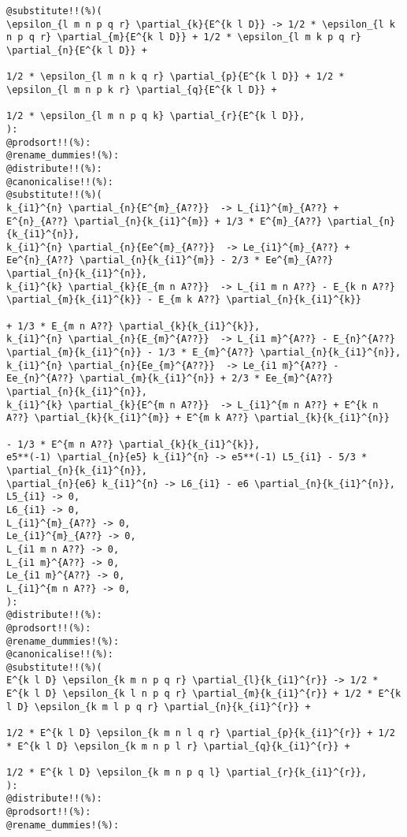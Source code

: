 \documentclass[11pt]{article}
\begin{document}
{\color[named]{Blue}\begin{verbatim}
@substitute!!(%)(
\epsilon_{l m n p q r} \partial_{k}{E^{k l D}} -> 1/2 * \epsilon_{l k n p q r} \partial_{m}{E^{k l D}} + 1/2 * \epsilon_{l m k p q r} \partial_{n}{E^{k l D}} + 
                                                                               1/2 * \epsilon_{l m n k q r} \partial_{p}{E^{k l D}} + 1/2 * \epsilon_{l m n p k r} \partial_{q}{E^{k l D}} +
                                                                               1/2 * \epsilon_{l m n p q k} \partial_{r}{E^{k l D}},
):
@prodsort!!(%):
@rename_dummies!(%):
@distribute!!(%):
@canonicalise!!(%):
@substitute!!(%)(
k_{i1}^{n} \partial_{n}{E^{m}_{A??}}  -> L_{i1}^{m}_{A??} + E^{n}_{A??} \partial_{n}{k_{i1}^{m}} + 1/3 * E^{m}_{A??} \partial_{n}{k_{i1}^{n}},
k_{i1}^{n} \partial_{n}{Ee^{m}_{A??}}  -> Le_{i1}^{m}_{A??} + Ee^{n}_{A??} \partial_{n}{k_{i1}^{m}} - 2/3 * Ee^{m}_{A??} \partial_{n}{k_{i1}^{n}},
k_{i1}^{k} \partial_{k}{E_{m n A??}}  -> L_{i1 m n A??} - E_{k n A??} \partial_{m}{k_{i1}^{k}} - E_{m k A??} \partial_{n}{k_{i1}^{k}}
                                                                                                                                                                                             + 1/3 * E_{m n A??} \partial_{k}{k_{i1}^{k}},
k_{i1}^{n} \partial_{n}{E_{m}^{A??}}  -> L_{i1 m}^{A??} - E_{n}^{A??} \partial_{m}{k_{i1}^{n}} - 1/3 * E_{m}^{A??} \partial_{n}{k_{i1}^{n}},
k_{i1}^{n} \partial_{n}{Ee_{m}^{A??}}  -> Le_{i1 m}^{A??} - Ee_{n}^{A??} \partial_{m}{k_{i1}^{n}} + 2/3 * Ee_{m}^{A??} \partial_{n}{k_{i1}^{n}},
k_{i1}^{k} \partial_{k}{E^{m n A??}}  -> L_{i1}^{m n A??} + E^{k n A??} \partial_{k}{k_{i1}^{m}} + E^{m k A??} \partial_{k}{k_{i1}^{n}}
                                                                                                                                                                                             - 1/3 * E^{m n A??} \partial_{k}{k_{i1}^{k}},
e5**(-1) \partial_{n}{e5} k_{i1}^{n} -> e5**(-1) L5_{i1} - 5/3 * \partial_{n}{k_{i1}^{n}},
\partial_{n}{e6} k_{i1}^{n} -> L6_{i1} - e6 \partial_{n}{k_{i1}^{n}},
L5_{i1} -> 0,
L6_{i1} -> 0,
L_{i1}^{m}_{A??} -> 0,
Le_{i1}^{m}_{A??} -> 0,
L_{i1 m n A??} -> 0,
L_{i1 m}^{A??} -> 0,
Le_{i1 m}^{A??} -> 0,
L_{i1}^{m n A??} -> 0,
):
@distribute!!(%):
@prodsort!!(%):
@rename_dummies!(%):
@canonicalise!!(%):
@substitute!!(%)(
E^{k l D} \epsilon_{k m n p q r} \partial_{l}{k_{i1}^{r}} -> 1/2 * E^{k l D} \epsilon_{k l n p q r} \partial_{m}{k_{i1}^{r}} + 1/2 * E^{k l D} \epsilon_{k m l p q r} \partial_{n}{k_{i1}^{r}} + 
                                                                               1/2 * E^{k l D} \epsilon_{k m n l q r} \partial_{p}{k_{i1}^{r}} + 1/2 * E^{k l D} \epsilon_{k m n p l r} \partial_{q}{k_{i1}^{r}} +
                                                                               1/2 * E^{k l D} \epsilon_{k m n p q l} \partial_{r}{k_{i1}^{r}},
):
@distribute!!(%):
@prodsort!!(%):
@rename_dummies!(%):
\end{verbatim}}
\end{document}

